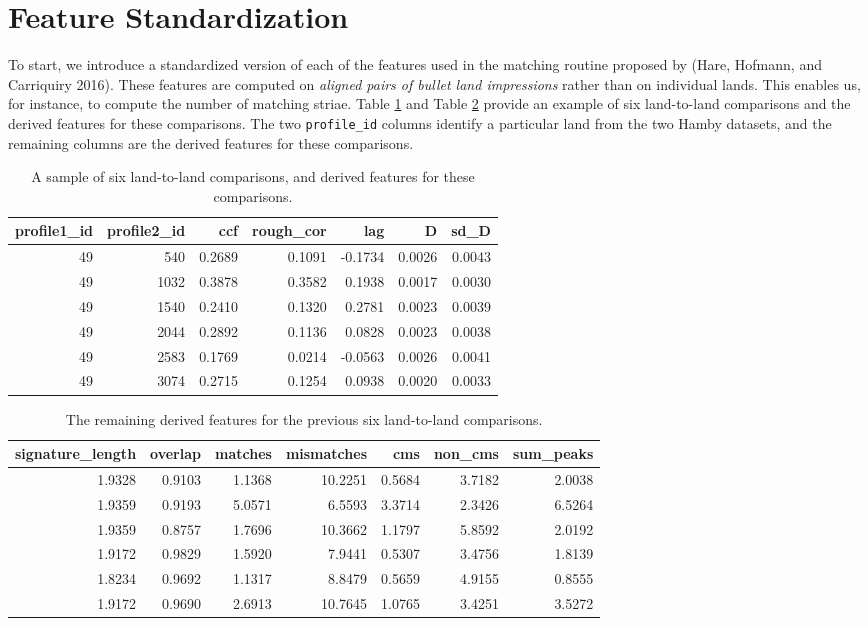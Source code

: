 \documentclass[12pt,]{article}
\theoremstyle{definition}
\theoremstyle{definition}
\theoremstyle{definition}
\theoremstyle{remark}
\begin{document}
\section{Feature Standardization}\label{feature-standardization}

To start, we introduce a standardized version of each of the features
used in the matching routine proposed by (Hare, Hofmann, and Carriquiry
2016). These features are computed on \emph{aligned pairs of bullet land
impressions} rather than on individual lands. This enables us, for
instance, to compute the number of matching striae. Table \ref{tab:ccf1}
and Table \ref{tab:ccf2} provide an example of six land-to-land
comparisons and the derived features for these comparisons. The two
\texttt{profile\_id} columns identify a particular land from the two
Hamby datasets, and the remaining columns are the derived features for
these comparisons.

\begin{table}[ht]
\centering
\begin{tabular}{rrrrrrr}
  \hline
profile1\_id & profile2\_id & ccf & rough\_cor & lag & D & sd\_D \\ 
  \hline
49 & 540 & 0.2689 & 0.1091 & -0.1734 & 0.0026 & 0.0043 \\ 
  49 & 1032 & 0.3878 & 0.3582 & 0.1938 & 0.0017 & 0.0030 \\ 
  49 & 1540 & 0.2410 & 0.1320 & 0.2781 & 0.0023 & 0.0039 \\ 
  49 & 2044 & 0.2892 & 0.1136 & 0.0828 & 0.0023 & 0.0038 \\ 
  49 & 2583 & 0.1769 & 0.0214 & -0.0563 & 0.0026 & 0.0041 \\ 
  49 & 3074 & 0.2715 & 0.1254 & 0.0938 & 0.0020 & 0.0033 \\ 
   \hline
\end{tabular}
\caption{A sample of six land-to-land comparisons, and derived features for these comparisons.} 
\label{tab:ccf1}
\end{table}

\begin{table}[ht]
\centering
\begin{tabular}{rrrrrrr}
  \hline
signature\_length & overlap & matches & mismatches & cms & non\_cms & sum\_peaks \\ 
  \hline
1.9328 & 0.9103 & 1.1368 & 10.2251 & 0.5684 & 3.7182 & 2.0038 \\ 
  1.9359 & 0.9193 & 5.0571 & 6.5593 & 3.3714 & 2.3426 & 6.5264 \\ 
  1.9359 & 0.8757 & 1.7696 & 10.3662 & 1.1797 & 5.8592 & 2.0192 \\ 
  1.9172 & 0.9829 & 1.5920 & 7.9441 & 0.5307 & 3.4756 & 1.8139 \\ 
  1.8234 & 0.9692 & 1.1317 & 8.8479 & 0.5659 & 4.9155 & 0.8555 \\ 
  1.9172 & 0.9690 & 2.6913 & 10.7645 & 1.0765 & 3.4251 & 3.5272 \\ 
   \hline
\end{tabular}
\caption{The remaining derived features for the previous six land-to-land comparisons.} 
\label{tab:ccf2}
\end{table}
\end{document}
